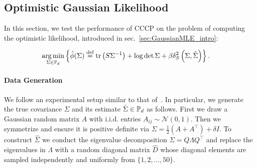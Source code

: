 \documentclass[sn-nature]{sn-jnl}%
\theoremstyle{thmstyleone}%
\theoremstyle{thmstyletwo}%
\theoremstyle{thmstylethree}%
\begin{document}








\newpage
\subsection{Optimistic Gaussian Likelihood}\label{section:gaussian_aux_mle}
In this section, we test the performance of CCCP on the problem of computing the optimistic likelihood, introduced in sec.~\ref{sec:GaussianMLE_intro}:

\begin{equation}\label{exp:sdiv_ball_MLE_Problem}
\begin{aligned}
    &\operatorname*{arg\,min}_{\Sigma \in \mathbb{P}_d} \left\{ \hat{\phi}(\Sigma) \stackrel{\text{def}}{=} \text{tr}\left(S \Sigma^{-1}\right) + \log \det \Sigma  + \beta \delta_S^2\left(\Sigma, \hat{\Sigma}\right) \right\}. 
\end{aligned}    
\end{equation}


\paragraph{Data Generation}
We follow an experimental setup similar to that of~\cite{Nguyen2019CalculatingOL}. In particular, we generate the true covariance $\Sigma$ and its estimate $\hat{\Sigma} \in \mathbb{P}_d$ as follows. First we draw a Gaussian random matrix $A$ with i.i.d. entries $A_{ij} \sim \mathcal{N}(0,1)$. Then we symmetrize and ensure it is positive definite via $\Sigma = \frac{1}{2}\left(A + A^\top\right) + \delta I$. To construct $\hat{\Sigma}$ we conduct the eigenvalue decomposition $\Sigma = Q \Lambda Q^\top$ and replace the eigenvalues in $\Lambda$ with a random diagonal matrix $\hat{D}$ whose diagonal elements are sampled independently and uniformly from $\{1, 2, \ldots, 50\}.$
\end{document}

